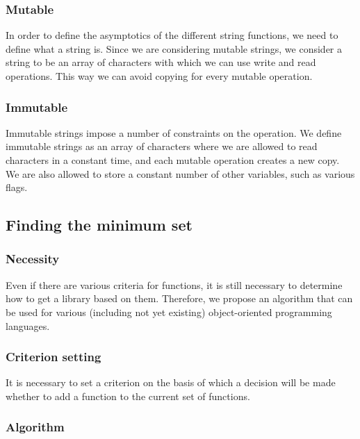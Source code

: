 \documentclass[anonymous,sigplan,review,11pt,nonacm,natbib=false]{acmart}
\begin{document}
    \subsubsection{Mutable}

    In order to define the asymptotics of the different string functions, we need to define what a string is. Since we are considering mutable strings, we consider a string to be an array of characters with which we can use write and read operations. This way we can avoid copying for every mutable operation.

    \subsubsection{Immutable}

    Immutable strings impose a number of constraints on the operation. We define immutable strings as an array of characters where we are allowed to read characters in a constant time, and each mutable operation creates a new copy. We are also allowed to store a constant number of other variables, such as various flags.

    \subsection{Finding the minimum set}

    \subsubsection{Necessity}

    Even if there are various criteria for functions, it is still necessary to determine how to get a library based on them. Therefore, we propose an algorithm that can be used for various (including not yet existing) object-oriented programming languages.

    \subsubsection{Criterion setting}

    \label{criterion}

    It is necessary to set a criterion on the basis of which a decision will be made whether to add a function to the current set of functions.

    \subsubsection{Algorithm}
\end{document}
